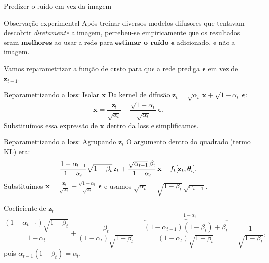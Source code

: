 \documentclass[aspectratio=169,xcolor=dvipsnames]{beamer}
\begin{document}

  \begin{frame}{Predizer o ruído em vez da imagem}
    \begin{alertblock}{Observação experimental}
      Após treinar diversos modelos difusores que tentavam descobrir
      \emph{diretamente} a imagem, percebeu-se empiricamente que os
      resultados eram \textbf{melhores} ao usar a rede para
      \textbf{estimar o ruído} $\boldsymbol{\epsilon}$ adicionado, e não a imagem.
    \end{alertblock}
    \vspace{0.5em}
    Vamos reparametrizar a função de custo para que a rede prediga
    $\boldsymbol{\epsilon}$ em vez de $\mathbf{z}_{t-1}$.
  \end{frame}

  \begin{frame}{Reparametrizando a loss: Isolar $\mathbf{x}$}
    Do kernel de difusão $\mathbf{z}_t = \sqrt{\alpha_t}\,\mathbf{x} + \sqrt{1-\alpha_t}\,\boldsymbol{\epsilon}$:
    \[
      \mathbf{x} = \frac{\mathbf{z}_t}{\sqrt{\alpha_t}} - \frac{\sqrt{1-\alpha_t}}{\sqrt{\alpha_t}}\,\boldsymbol{\epsilon}.
    \]
    \vspace{0.3em}
    Substituímos essa expressão de $\mathbf{x}$ dentro da loss e simplificamos.
  \end{frame}

  \begin{frame}{Reparametrizando a loss: Agrupando $\mathbf{z}_t$}
    O argumento dentro do quadrado (termo KL) era:
    \[
      \frac{1-\alpha_{t-1}}{1-\alpha_t}\sqrt{1-\beta_t}\, \mathbf{z}_t
      + \frac{\sqrt{\alpha_{t-1}}\,\beta_t}{1-\alpha_t}\, \mathbf{x}
      - f_t[\mathbf{z}_t,\bm{\theta}_t].
    \]
    Substituímos $\mathbf{x} = \tfrac{\mathbf{z}_t}{\sqrt{\alpha_t}} - \tfrac{\sqrt{1-\alpha_t}}{\sqrt{\alpha_t}}\,\boldsymbol{\epsilon}$
    e usamos $\sqrt{\alpha_t} = \sqrt{1-\beta_t}\,\sqrt{\alpha_{t-1}}$.
    \begin{block}{Coeficiente de $\mathbf{z}_t$}
      \[
        \frac{(1-\alpha_{t-1})\sqrt{1-\beta_t}}{1-\alpha_t}
        + \frac{\beta_t}{(1-\alpha_t)\sqrt{1-\beta_t}}
        = \frac{\overbrace{(1-\alpha_{t-1})(1-\beta_t)+\beta_t}^{=\;1-\alpha_t}}{(1-\alpha_t)\sqrt{1-\beta_t}}
        = \frac{1}{\sqrt{1-\beta_t}},
      \]
      \vspace{0.1em}
      pois $\alpha_{t-1}(1-\beta_t) = \alpha_t$.
    \end{block}
  \end{frame}
\end{document}

